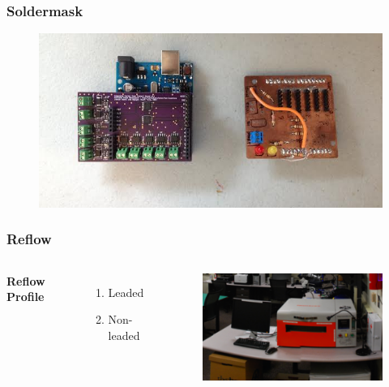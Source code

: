 \documentclass{beamer}
\begin{document}

\begin{frame}
\frametitle{Soldermask}
\begin{figure}
\includegraphics[width=1\linewidth]{soldermask.png}
\end{figure}
\end{frame}


\begin{frame}
\frametitle{Reflow}
\begin{columns}[c] %

\textbf{Reflow Profile}
\begin{enumerate}
\item Leaded
\item Non-leaded
\end{enumerate}

\begin{figure}
\includegraphics[width=0.8\linewidth]{psu-epl.png}
\end{figure}

\end{columns}
\end{frame}
\end{document}
